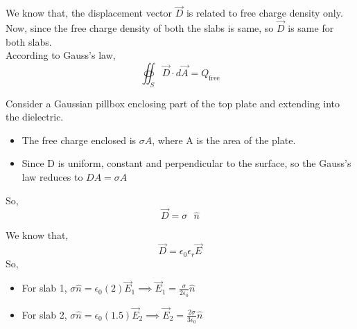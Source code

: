 \documentclass[a4paper]{article}
\begin{document}
\begin{tcolorbox}[
    title=Solution,
    colback=white,
    colframe=myblue,
    coltitle=black,
    fonttitle=\bfseries\large,
    breakable,
    enhanced,
    attach boxed title to top center={yshift=-2mm},
    boxed title style={colback=myblue!20, colframe=myblue}
]
\begin{tcolorbox}[
    title=Part (a),
    colframe=cyan!60, 
    colback=cyan!10,
    coltitle=black,
    fonttitle=\bfseries\large,
    breakable,
    enhanced,
    attach boxed title to top center={yshift=-2mm},
    boxed title style={colback=cyan!10, colframe=cyan!60}
]
We know that, the displacement vector $ \vec{D} $ is related to free charge density only. Now, since the free charge density of both the slabs is same, so $ \vec{D} $ is same for both slabs. \\
According to Gauss's law,
\[
\oiint_S \vec{D} \cdot d\vec{A} = Q_{\text{free}}
\]

Consider a Gaussian pillbox enclosing part of the top plate and extending into the dielectric.
\begin{itemize}
\item The free charge enclosed is $\sigma A$, where A is the area of the plate.
\item Since D is uniform, constant and perpendicular to the surface, so the Gauss's law reduces to $ DA = \sigma A $
\end{itemize}
So, 
\[
\boxed{\vec{D} = \sigma \text{ } \hat{n}}
\]
\end{tcolorbox}

\begin{tcolorbox}[
    title=Part (b),
    colframe=cyan!60, 
    colback=cyan!10,
    coltitle=black,
    fonttitle=\bfseries\large,
    breakable,
    enhanced,
    attach boxed title to top center={yshift=-2mm},
    boxed title style={colback=cyan!10, colframe=cyan!60}
]
We know that, 
\[
\vec{D} = \epsilon_0 \epsilon_r \vec{E}
\]
So,
\begin{itemize}
\item For slab 1, \newline
$\sigma \hat{n} = \epsilon_0 (2) \vec{E}_1
\implies \boxed{\vec{E}_1 = \frac{\sigma}{2\epsilon_0} \hat{n}} $ 
\item For slab 2, \newline
$\sigma \hat{n} = \epsilon_0 (1.5) \vec{E}_2
\implies \boxed{\vec{E}_2 = \frac{2\sigma}{3\epsilon_0} \hat{n}} $ 
\end{itemize}
\end{tcolorbox}


\end{tcolorbox}
\end{document}

